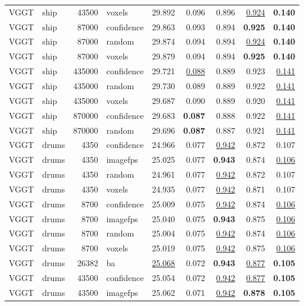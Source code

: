 \begin{table}[H]
\begin{tabular}{llrlrrrrr}
VGGT & ship & 43500 & voxels & 29.892 & 0.096 & 0.896 & \underline{0.924} & \textbf{0.140} \\
VGGT & ship & 87000 & confidence & 29.863 & 0.093 & 0.894 & \textbf{0.925} & \textbf{0.140} \\
VGGT & ship & 87000 & random & 29.874 & 0.094 & 0.894 & \underline{0.924} & \textbf{0.140} \\
VGGT & ship & 87000 & voxels & 29.879 & 0.094 & 0.894 & \textbf{0.925} & \textbf{0.140} \\
VGGT & ship & 435000 & confidence & 29.721 & \underline{0.088} & 0.889 & 0.923 & \underline{0.141} \\
VGGT & ship & 435000 & random & 29.730 & 0.089 & 0.889 & 0.922 & \underline{0.141} \\
VGGT & ship & 435000 & voxels & 29.687 & 0.090 & 0.889 & 0.920 & \underline{0.141} \\
VGGT & ship & 870000 & confidence & 29.683 & \textbf{0.087} & 0.888 & 0.922 & \underline{0.141} \\
VGGT & ship & 870000 & random & 29.696 & \textbf{0.087} & 0.887 & 0.921 & \underline{0.141} \\
\midrule
VGGT & drums & 4350 & confidence & 24.966 & 0.077 & \underline{0.942} & 0.872 & 0.107 \\
VGGT & drums & 4350 & imagefps & 25.025 & 0.077 & \textbf{0.943} & 0.874 & \underline{0.106} \\
VGGT & drums & 4350 & random & 24.961 & 0.077 & \underline{0.942} & 0.872 & 0.107 \\
VGGT & drums & 4350 & voxels & 24.935 & 0.077 & \underline{0.942} & 0.871 & 0.107 \\
VGGT & drums & 8700 & confidence & 25.009 & 0.075 & \underline{0.942} & 0.874 & \underline{0.106} \\
VGGT & drums & 8700 & imagefps & 25.040 & 0.075 & \textbf{0.943} & 0.875 & \underline{0.106} \\
VGGT & drums & 8700 & random & 25.004 & 0.075 & \underline{0.942} & 0.874 & \underline{0.106} \\
VGGT & drums & 8700 & voxels & 25.019 & 0.075 & \underline{0.942} & 0.875 & \underline{0.106} \\
VGGT & drums & 26382 & ba & \underline{25.068} & 0.072 & \textbf{0.943} & \underline{0.877} & \textbf{0.105} \\
VGGT & drums & 43500 & confidence & 25.054 & 0.072 & \underline{0.942} & \underline{0.877} & \textbf{0.105} \\
VGGT & drums & 43500 & imagefps & 25.062 & 0.071 & \underline{0.942} & \textbf{0.878} & \textbf{0.105} \\

\end{tabular}
\end{table}
